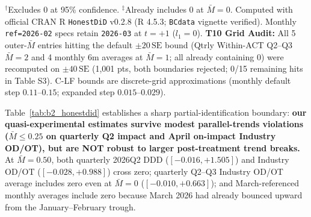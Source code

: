 \documentclass[11pt,letterpaper]{article}
\begin{document}
\begin{table}[H]
\begin{tabularx}{\textwidth}{@{} >{\raggedright\arraybackslash}X c c c c c @{}}
\bottomrule
\end{tabularx}
\par\smallskip\raggedright\footnotesize
$^\dagger$Excludes 0 at 95\% confidence. $^\ddagger$Already includes 0 at $\bar{M}=0$. Computed with official CRAN R \texttt{HonestDiD} v0.2.8 (R 4.5.3; \texttt{BCdata} vignette verified). Monthly \texttt{ref=2026-02} specs retain \texttt{2026-03} at $t=+1$ ($l_1=0$). \textbf{T10 Grid Audit:} All 5 outer-$\bar{M}$ entries hitting the default $\pm 20\,\mathrm{SE}$ bound (Qtrly Within-ACT Q2--Q3 $\bar{M}=2$ and 4 monthly 6m averages at $\bar{M}=1$; all already containing 0) were recomputed on $\pm 40\,\mathrm{SE}$ (1,001 pts, both boundaries rejected; 0/15 remaining hits in Table S3). C-LF bounds are discrete-grid approximations (monthly default step $0.11$--$0.15$; expanded step $0.015$--$0.029$).
\end{table}

Table~\ref{tab:b2_honestdid} establishes a sharp partial-identification boundary: \textbf{our quasi-experimental estimates survive modest parallel-trends violations ($\bar{M}\le 0.25$ on quarterly Q2 impact and April on-impact Industry OD/OT), but are NOT robust to larger post-treatment trend breaks.} At $\bar{M}=0.50$, both quarterly 2026Q2 DDD ($[-0.016, +1.505]$) and Industry OD/OT ($[-0.028, +0.988]$) cross zero; quarterly Q2--Q3 Industry OD/OT average includes zero even at $\bar{M}=0$ ($[-0.010, +0.663]$); and March-referenced monthly averages include zero because March 2026 had already bounced upward from the January--February trough.
\end{document}
